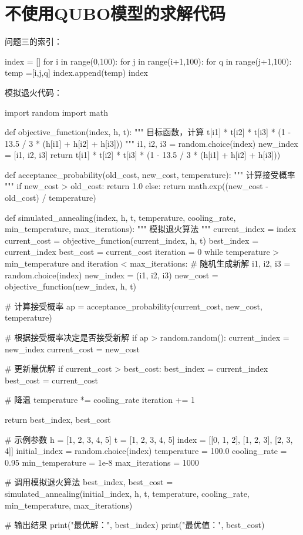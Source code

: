 \documentclass{MathorCupmodeling}
\begin{document}
\section{不使用QUBO模型的求解代码}
问题三的索引：
\begin{python}
index = []
for i in range(0,100):
    for j in range(i+1,100):
        for q in range(j+1,100):
            temp =[i,j,q]
            index.append(temp)
index
\end{python}
模拟退火代码：
\begin{python}
import random
import math

def objective_function(index, h, t):
    """
    目标函数，计算 t[i1] * t[i2] * t[i3] * (1 - 13.5 / 3 * (h[i1] + h[i2] + h[i3]))
    """
    i1, i2, i3 = random.choice(index)
    new_index = [i1, i2, i3]
    return t[i1] * t[i2] * t[i3] * (1 - 13.5 / 3 * (h[i1] + h[i2] + h[i3]))

def acceptance_probability(old_cost, new_cost, temperature):
    """
    计算接受概率
    """
    if new_cost > old_cost:
        return 1.0
    else:
        return math.exp((new_cost - old_cost) / temperature)

def simulated_annealing(index, h, t, temperature, cooling_rate, min_temperature, max_iterations):
    """
    模拟退火算法
    """
    current_index = index
    current_cost = objective_function(current_index, h, t)
    best_index = current_index
    best_cost = current_cost
    iteration = 0
    while temperature > min_temperature and iteration < max_iterations:
        # 随机生成新解
        i1, i2, i3 = random.choice(index)
        new_index = (i1, i2, i3)
        new_cost = objective_function(new_index, h, t)

        # 计算接受概率
        ap = acceptance_probability(current_cost, new_cost, temperature)

        # 根据接受概率决定是否接受新解
        if ap > random.random():
            current_index = new_index
            current_cost = new_cost

        # 更新最优解
        if current_cost > best_cost:
            best_index = current_index
            best_cost = current_cost

        # 降温
        temperature *= cooling_rate
        iteration += 1

    return best_index, best_cost

# 示例参数
h = [1, 2, 3, 4, 5]
t = [1, 2, 3, 4, 5]
index = [[0, 1, 2], [1, 2, 3], [2, 3, 4]]
initial_index = random.choice(index)
temperature = 100.0
cooling_rate = 0.95
min_temperature = 1e-8
max_iterations = 1000

# 调用模拟退火算法
best_index, best_cost = simulated_annealing(initial_index, h, t, temperature, cooling_rate, min_temperature, max_iterations)

# 输出结果
print("最优解：", best_index)
print("最优值：", best_cost)
\end{python}
\end{document}
